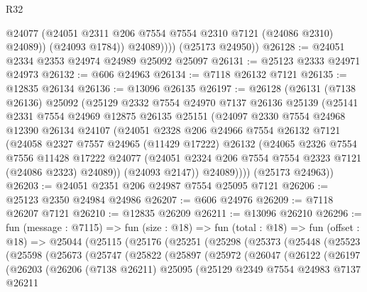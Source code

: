 \begin{lexlean}{R32}
\begin{coremodule}
                  @24077
                  (@24051 @2311 @206 @7554 @7554 @2310 @7121 (@24086 @2310) @24089))
                (@24093 @1784))
              @24089))))
      (@25173 @24950))
@26128 := @24051 @2334 @2353 @24974 @24989 @25092 @25097
@26131 := @25123 @2333 @24971 @24973
@26132 := @606 @24963
@26134 := @7118 @26132 @7121
@26135 := @12835 @26134
@26136 := @13096 @26135
@26197 := @26128
    (@26131
      (@7138 @26136)
      @25092
      (@25129
        @2332
        @7554
        @24970
        @7137
        @26136
        @25139
        (@25141
          @2331
          @7554
          @24969
          @12875
          @26135
          @25151
          (@24097
            @2330
            @7554
            @24968
            @12390
            @26134
            @24107
            (@24051
              @2328
              @206
              @24966
              @7554
              @26132
              @7121
              (@24058
                @2327
                @7557
                @24965
                (@11429 @17222)
                @26132
                (@24065
                  @2326
                  @7554
                  @7556
                  @11428
                  @17222
                  @24077
                  (@24051 @2324 @206 @7554 @7554 @2323 @7121 (@24086 @2323) @24089))
                (@24093 @2147))
              @24089))))
      (@25173 @24963))
@26203 := @24051 @2351 @206 @24987 @7554 @25095 @7121
@26206 := @25123 @2350 @24984 @24986
@26207 := @606 @24976
@26209 := @7118 @26207 @7121
@26210 := @12835 @26209
@26211 := @13096 @26210
@26296 := fun (message : @7115) =>
  fun (size : @18) =>
  fun (total : @18) =>
  fun (offset : @18) =>
  @25044
    (@25115
      (@25176
        (@25251
          (@25298
            (@25373
              (@25448
                (@25523
                  (@25598
                    (@25673
                      (@25747
                        (@25822
                          (@25897
                            (@25972
                              (@26047
                                (@26122
                                  (@26197
                                    (@26203
                                      (@26206
                                        (@7138 @26211)
                                        @25095
                                        (@25129
                                          @2349
                                          @7554
                                          @24983
                                          @7137
                                          @26211

\end{coremodule}
\end{lexlean}
